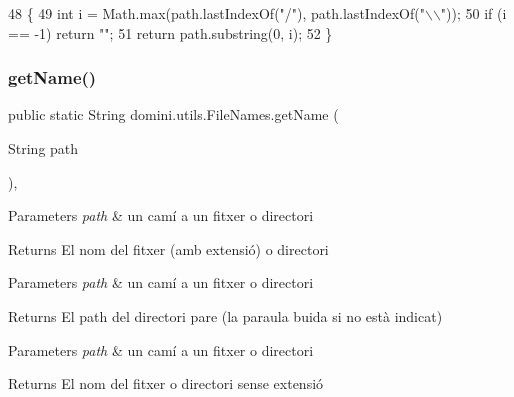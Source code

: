 \begin{DoxyCode}
48                                                   \{
49         \textcolor{keywordtype}{int} i = Math.max(path.lastIndexOf(\textcolor{stringliteral}{"/"}), path.lastIndexOf(\textcolor{stringliteral}{"\(\backslash\)\(\backslash\)"}));
50         \textcolor{keywordflow}{if} (i == -1) \textcolor{keywordflow}{return} \textcolor{stringliteral}{""};
51         \textcolor{keywordflow}{return} path.substring(0, i);
52     \}
\end{DoxyCode}
\mbox{\label{classdomini_1_1utils_1_1FileNames_ade42cac265a0eb6d3bbccc671f669253}} 
\subsubsection{\texorpdfstring{get\+Name()}{getName()}}
{\footnotesize\ttfamily public static String domini.\+utils.\+File\+Names.\+get\+Name (\begin{DoxyParamCaption}\item[{String}]{path }\end{DoxyParamCaption})\hspace{0.3cm}{\ttfamily [inline]}, {\ttfamily [static]}}


\begin{DoxyParams}{Parameters}
{\em path} & un camí a un fitxer o directori \\
\hline
\end{DoxyParams}
\begin{DoxyReturn}{Returns}
El nom del fitxer (amb extensió) o directori
\end{DoxyReturn}

\begin{DoxyParams}{Parameters}
{\em path} & un camí a un fitxer o directori \\
\hline
\end{DoxyParams}
\begin{DoxyReturn}{Returns}
El path del directori pare (la paraula buida si no està indicat)
\end{DoxyReturn}

\begin{DoxyParams}{Parameters}
{\em path} & un camí a un fitxer o directori \\
\hline
\end{DoxyParams}
\begin{DoxyReturn}{Returns}
El nom del fitxer o directori sense extensió 
\end{DoxyReturn}

